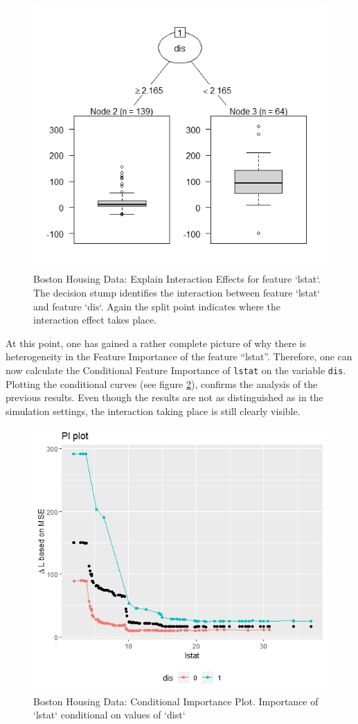\documentclass[
]{krantz}
\begin{document}
\begin{figure}

{\centering \includegraphics[width=0.7\linewidth]{images/03-7-RD3} 

}

\caption{Boston Housing Data: Explain Interaction Effects for feature `lstat`. The decision stump identifies the interaction between feature `lstat` and feature `dis`. Again the split point indicates where the interaction effect takes place.}\label{fig:fig11}
\end{figure}

At this point, one has gained a rather complete picture of why there is heterogeneity in the Feature Importance of the feature ``lstat''. Therefore, one can now calculate the Conditional Feature Importance of \texttt{lstat} on the variable \texttt{dis}. Plotting the conditional curves (see figure \ref{fig:fig12}), confirms the analysis of the previous results. Even though the results are not as distinguished as in the simulation settings, the interaction taking place is still clearly visible.

\begin{figure}

{\centering \includegraphics[width=0.75\linewidth]{images/03-7-RD4} 

}

\caption{Boston Housing Data: Conditional Importance Plot. Importance of `lstat` conditional on values of `dist`}\label{fig:fig12}
\end{figure}
\end{document}
